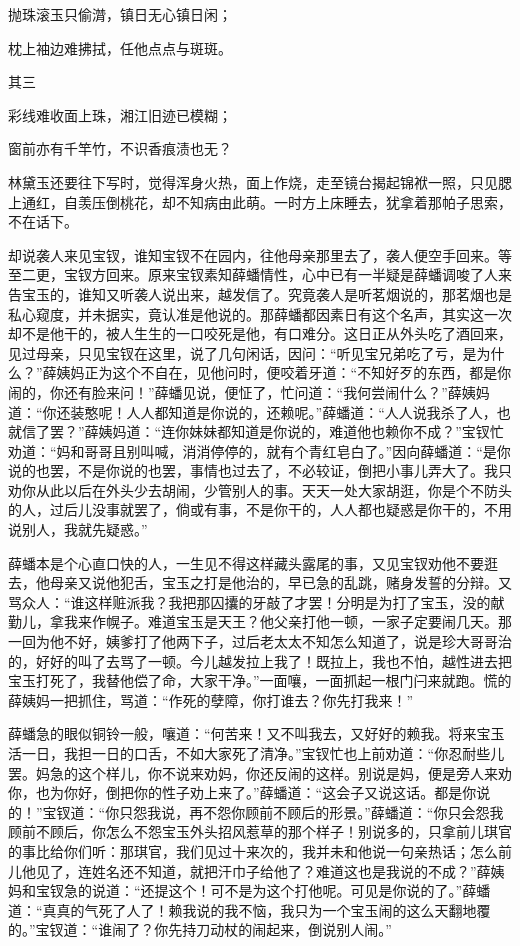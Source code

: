 抛珠滚玉只偷潸，镇日无心镇日闲；

枕上袖边难拂拭，任他点点与斑斑。

其三

彩线难收面上珠，湘江旧迹已模糊；

窗前亦有千竿竹，不识香痕渍也无？

林黛玉还要往下写时，觉得浑身火热，面上作烧，走至镜台揭起锦袱一照，只见腮上通红，自羡压倒桃花，却不知病由此萌。一时方上床睡去，犹拿着那帕子思索，不在话下。

却说袭人来见宝钗，谁知宝钗不在园内，往他母亲那里去了，袭人便空手回来。等至二更，宝钗方回来。原来宝钗素知薛蟠情性，心中已有一半疑是薛蟠调唆了人来告宝玉的，谁知又听袭人说出来，越发信了。究竟袭人是听茗烟说的，那茗烟也是私心窥度，并未据实，竟认准是他说的。那薛蟠都因素日有这个名声，其实这一次却不是他干的，被人生生的一口咬死是他，有口难分。这日正从外头吃了酒回来，见过母亲，只见宝钗在这里，说了几句闲话，因问：“听见宝兄弟吃了亏，是为什么？”薛姨妈正为这个不自在，见他问时，便咬着牙道：“不知好歹的东西，都是你闹的，你还有脸来问！”薛蟠见说，便怔了，忙问道：“我何尝闹什么？”薛姨妈道：“你还装憨呢！人人都知道是你说的，还赖呢。”薛蟠道：“人人说我杀了人，也就信了罢？”薛姨妈道：“连你妹妹都知道是你说的，难道他也赖你不成？”宝钗忙劝道：“妈和哥哥且别叫喊，消消停停的，就有个青红皂白了。”因向薛蟠道：“是你说的也罢，不是你说的也罢，事情也过去了，不必较证，倒把小事儿弄大了。我只劝你从此以后在外头少去胡闹，少管别人的事。天天一处大家胡逛，你是个不防头的人，过后儿没事就罢了，倘或有事，不是你干的，人人都也疑惑是你干的，不用说别人，我就先疑惑。”

薛蟠本是个心直口快的人，一生见不得这样藏头露尾的事，又见宝钗劝他不要逛去，他母亲又说他犯舌，宝玉之打是他治的，早已急的乱跳，赌身发誓的分辩。又骂众人：“谁这样赃派我？我把那囚攮的牙敲了才罢！分明是为打了宝玉，没的献勤儿，拿我来作幌子。难道宝玉是天王？他父亲打他一顿，一家子定要闹几天。那一回为他不好，姨爹打了他两下子，过后老太太不知怎么知道了，说是珍大哥哥治的，好好的叫了去骂了一顿。今儿越发拉上我了！既拉上，我也不怕，越性进去把宝玉打死了，我替他偿了命，大家干净。”一面嚷，一面抓起一根门闩来就跑。慌的薛姨妈一把抓住，骂道：“作死的孽障，你打谁去？你先打我来！”

薛蟠急的眼似铜铃一般，嚷道：“何苦来！又不叫我去，又好好的赖我。将来宝玉活一日，我担一日的口舌，不如大家死了清净。”宝钗忙也上前劝道：“你忍耐些儿罢。妈急的这个样儿，你不说来劝妈，你还反闹的这样。别说是妈，便是旁人来劝你，也为你好，倒把你的性子劝上来了。”薛蟠道：“这会子又说这话。都是你说的！”宝钗道：“你只怨我说，再不怨你顾前不顾后的形景。”薛蟠道：“你只会怨我顾前不顾后，你怎么不怨宝玉外头招风惹草的那个样子！别说多的，只拿前儿琪官的事比给你们听：那琪官，我们见过十来次的，我并未和他说一句亲热话；怎么前儿他见了，连姓名还不知道，就把汗巾子给他了？难道这也是我说的不成？”薛姨妈和宝钗急的说道：“还提这个！可不是为这个打他呢。可见是你说的了。”薛蟠道：“真真的气死了人了！赖我说的我不恼，我只为一个宝玉闹的这么天翻地覆的。”宝钗道：“谁闹了？你先持刀动杖的闹起来，倒说别人闹。”

